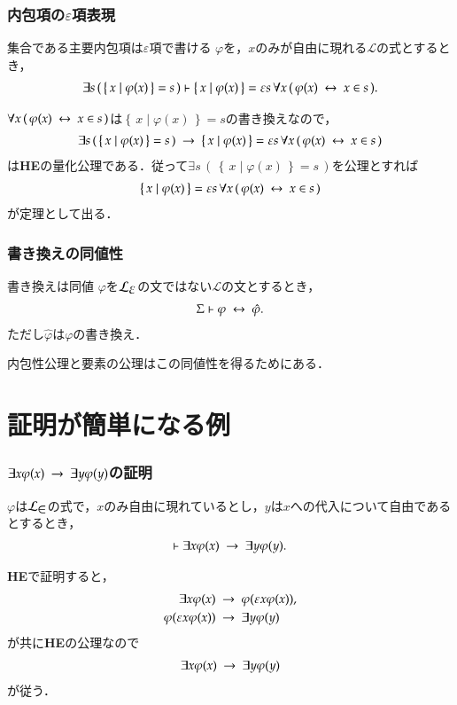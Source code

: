 \documentclass[dvipdfmx,10pt,notheorems]{beamer}
\theoremstyle{definition}
\newcommand{\lang}[1]{\mathcal{L}_{\scalebox{1.2}{$#1$}}} %
\newcommand{\Set}[2]{\left\{\, #1 \mid #2\, \right\}} %
\newcommand{\rarrow}{\hspace{0.25em}\rightarrow\hspace{0.25em}} %
\newcommand{\lrarrow}{\hspace{0.25em}\leftrightarrow\hspace{0.25em}} %
\begin{document}
\begin{frame}\frametitle{内包項の$\varepsilon$項表現}
	\begin{block}{集合である主要内包項は$\varepsilon$項で書ける}
		$\varphi$を，$x$のみが自由に現れる$\mathcal{L}$の式とするとき，
		\begin{align}
			\exists s\, (\, \Set{x}{\varphi(x)} = s\, )
			\vdash \Set{x}{\varphi(x)} = 
			\varepsilon s\, \forall x\, (\, \varphi(x) \lrarrow x \in s\, ).
		\end{align}
	\end{block}
	
	$\forall x\, (\, \varphi(x) \lrarrow x \in s\, )$は$\Set{x}{\varphi(x)} = s$の書き換えなので，
	\begin{align}
		\exists s\, (\, \Set{x}{\varphi(x)} = s\, ) \rarrow 
		\Set{x}{\varphi(x)} = \varepsilon s\, \forall x\, (\, \varphi(x) \lrarrow x \in s\, )
	\end{align}
	は{\bf HE}の量化公理である．従って$\exists s\, (\, \Set{x}{\varphi(x)} = s\, )$を公理とすれば
	\begin{align}
		\Set{x}{\varphi(x)} = \varepsilon s\, \forall x\, (\, \varphi(x) \lrarrow x \in s\, )
	\end{align}
	が定理として出る．
\end{frame}

\begin{frame}\frametitle{書き換えの同値性}
	\begin{block}{書き換えは同値}
		$\varphi$を$\lang{\varepsilon}$の文ではない$\mathcal{L}$の文とするとき，
		\begin{align}
			\Sigma \vdash \varphi \lrarrow \hat{\varphi}.
		\end{align}
		ただし$\hat{\varphi}$は$\varphi$の書き換え．
	\end{block}
	
	内包性公理と要素の公理はこの同値性を得るためにある．
	
\end{frame}

\section{証明が簡単になる例}
\begin{frame}\frametitle{$\exists x \varphi(x) \rarrow \exists y \varphi(y)$の証明}
	\begin{block}{}
		$\varphi$は$\lang{\in}$の式で，$x$のみ自由に現れているとし，$y$は$x$への代入について自由であるとするとき，
		\begin{align}
			\vdash \exists x \varphi(x) \rarrow \exists y \varphi(y).
		\end{align}
	\end{block}
	{\bf HE}で証明すると，
	\begin{align}
		\exists x \varphi(x) &\rarrow \varphi(\varepsilon x \varphi(x)), \\
		\varphi(\varepsilon x \varphi(x)) &\rarrow \exists y \varphi(y)
	\end{align}
	が共に{\bf HE}の公理なので
	\begin{align}
		\exists x \varphi(x) \rarrow \exists y \varphi(y)
	\end{align}
	が従う．
\end{frame}
\end{document}
